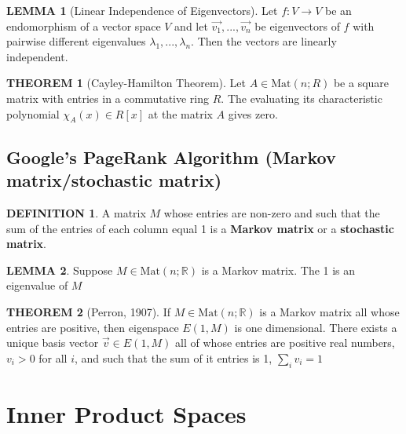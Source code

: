 \documentclass[10pt]{article}
\theoremstyle{definition}
\newtheorem{definition}{DEFINITION}[subsection]
\newtheorem{theorem}{THEOREM}[subsection]
\newcommand{\Mat}{\text{Mat}}
\newtheorem{lemma}{LEMMA}[subsection]
\begin{document}
\begin{lemma}[Linear Independence of Eigenvectors]
    Let $f:V \rightarrow V$ be an endomorphism of a vector space $V$ and let $\vec{v_1}, ...,\vec{v_n}$ be eigenvectors of $f$ with pairwise different eigenvalues $\lambda_1, ..., \lambda_n$. Then the vectors are linearly independent.
\end{lemma}

\begin{theorem}[Cayley-Hamilton Theorem]
    Let $A \in \Mat(n;R)$ be a square matrix with entries in a commutative ring $R$. The evaluating its characteristic polynomial $\chi_{A}(x)\in R[x]$ at the matrix $A$ gives zero.
\end{theorem}


\subsection{Google’s PageRank Algorithm (Markov matrix/stochastic matrix)}
\begin{definition}
    A matrix $M$ whose entries are non-zero and such that the sum of the entries of each column equal 1 is a \textbf{Markov matrix} or a \textbf{stochastic matrix}.
\end{definition}

\begin{lemma}
    Suppose $M\in \Mat(n;\mathbb{R})$ is a Markov matrix. The 1 is an eigenvalue of $M$
\end{lemma}

\begin{theorem}[Perron, 1907]
    If $M \in \Mat(n;\mathbb{R})$ is a Markov matrix all whose entries are positive, then eigenspace $E(1,M)$ is one dimensional. There exists a unique basis vector $\vec{v} \in E(1,M)$ all of whose entries are positive real numbers, $v_i > 0$ for all $i$, and such that the sum of it entries is 1, $\sum_i v_i = 1$
\end{theorem}


\newpage
\section{Inner Product Spaces}
\end{document}
